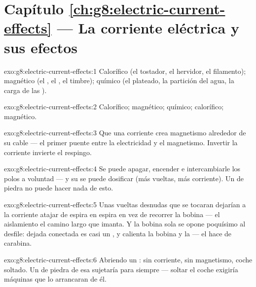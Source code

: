\section*{Capítulo \ref{ch:g8:electric-current-effects} --- La corriente eléctrica y sus efectos}

\begin{solution}{exo:g8:electric-current-effects:1}
Calorífico (el tostador, el hervidor, el filamento); magnético (el
, el , el timbre); químico (el plateado, la
partición del agua, la carga de las ).
\end{solution}

\begin{solution}{exo:g8:electric-current-effects:2}
Calorífico; magnético; químico; calorífico; magnético.
\end{solution}

\begin{solution}{exo:g8:electric-current-effects:3}
Que una corriente crea magnetismo alrededor de su cable --- el primer
puente entre la electricidad y el magnetismo. Invertir la corriente
invierte el respingo.
\end{solution}

\begin{solution}{exo:g8:electric-current-effects:4}
Se puede apagar, encender e intercambiarle los polos a voluntad --- y
su  se puede dosificar (más vueltas, más corriente). Un
 de piedra no puede hacer nada de esto.
\end{solution}

\begin{solution}{exo:g8:electric-current-effects:5}
Unas vueltas desnudas que se tocaran dejarían a la corriente atajar de
espira en espira en vez de recorrer la bobina --- el aislamiento
 el camino largo que imanta. Y la bobina sola se opone
poquísimo al desfile: dejada conectada es casi un
, y calienta la bobina y la  --- el
 hace de carabina.
\end{solution}

\begin{solution}{exo:g8:electric-current-effects:6}
Abriendo un : sin corriente, sin magnetismo, coche
soltado. Un  de piedra de esa  sujetaría para siempre ---
soltar el coche exigiría máquinas que lo arrancaran de él.
\end{solution}

